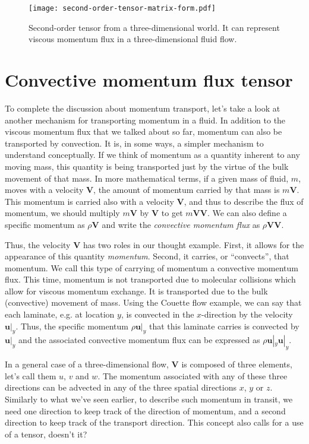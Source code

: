 \documentclass[10pt,twocolumn]{article}
\begin{document}
\begin{figure}[t!]
\centering\texttt{[image: second-order-tensor-matrix-form.pdf]}
\caption{Second-order tensor from a three-dimensional world. It can represent viscous momentum flux in a three-dimensional fluid flow.}
\label{fig:tensor-in-matrix-form}
\end{figure}

\section*{Convective momentum flux tensor}

To complete the discussion about momentum transport, let's take a look at another mechanism for transporting momentum in a fluid. In addition to the viscous momentum flux that we talked about so far, momentum can also be transported by convection. It is, in some ways, a simpler mechanism to understand conceptually. If we think of momentum as a quantity inherent to any moving mass, this quantity is being transported just by the virtue of the bulk movement of that mass. In more mathematical terms, if a given mass of fluid, $m$, moves with a velocity $\pmb{V}$, the amount of momentum carried by that mass is $m \pmb{V}$. This momentum is carried also with a velocity $\pmb{V}$, and thus to describe the flux of momentum, we should multiply $m \pmb{V}$ by $\pmb{V}$ to get $m \pmb{V} \pmb{V}$. We can also define a specific momentum as $\rho \pmb{V}$ and write the \textit{convective momentum flux} as $\rho \pmb{V} \pmb{V}$.

Thus, the velocity $\pmb{V}$ has two roles in our thought example. First, it allows for the appearance of this quantity \textit{momentum}. Second, it carries, or ``convects'', that momentum. We call this type of carrying of momentum a convective momentum flux. This time, momentum is not transported due to molecular collisions which allow for viscous momentum exchange. It is transported due to the bulk (convective) movement of mass. Using the Couette flow example, we can say that each laminate, e.g. at location $y$, is convected in the $x$-direction by the velocity $\pmb{u}|_y$. Thus, the specific momentum $\rho \pmb{u}|_y$ that this laminate carries is convected by $\pmb{u}|_y$ and the associated convective momentum flux can be expressed as $\rho \pmb{u}|_y \pmb{u}|_y$.

In a general case of a three-dimensional flow, $\pmb{V}$ is composed of three elements, let's call them $u$, $v$ and $w$. The momentum associated with any of these three directions can be advected in any of the three spatial directions $x$, $y$ or $z$. Similarly to what we've seen earlier, to describe such momentum in transit, we need one direction to keep track of the direction of momentum, and a second direction to keep track of the transport direction. This concept also calls for a use of a tensor, doesn't it?
\end{document}
